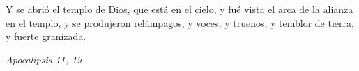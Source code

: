 \documentclass[../../devocionario.tex]{subfiles}
\begin{document}
    Y se abrió el templo de Dios, que está en el cielo, y fué vista el arca de la alianza en el templo, 
    y se produjeron relámpagos, y voces, y truenos, y temblor de tierra, y fuerte granizada. 

    \begin{flushright}
        \emph{Apocalipsis 11, 19}
    \end{flushright}
\end{document}
